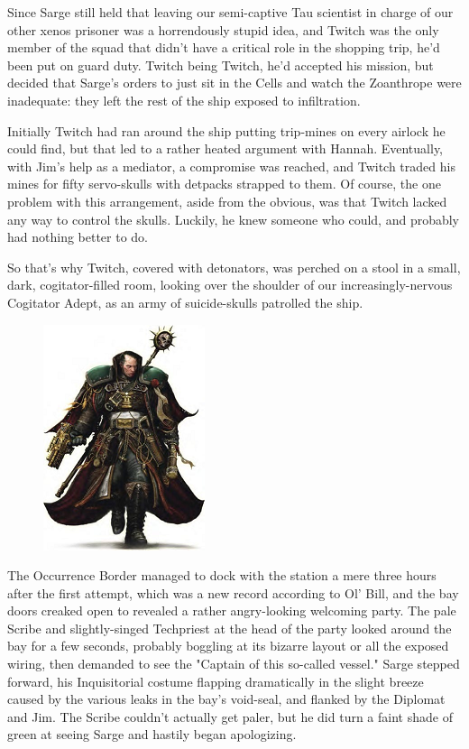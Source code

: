 Since Sarge still held that leaving our semi-captive Tau scientist in charge of our other xenos prisoner was a horrendously stupid idea, and Twitch was the only member of the squad that didn't have a critical role in the shopping trip, he'd been put on guard duty. 
Twitch being Twitch, he'd accepted his mission, but decided that Sarge's orders to just sit in the Cells and watch the Zoanthrope were inadequate: 
they left the rest of the ship exposed to infiltration.

Initially Twitch had ran around the ship putting trip-mines on every airlock he could find, but that led to a rather heated argument with Hannah. 
Eventually, with Jim's help as a mediator, a compromise was reached, and Twitch traded his mines for fifty servo-skulls with detpacks strapped to them. 
Of course, the one problem with this arrangement, aside from the obvious, was that Twitch lacked any way to control the skulls. 
Luckily, he knew someone who could, and probably had nothing better to do.

So that's why Twitch, covered with detonators, was perched on a stool in a small, dark, cogitator-filled room, looking over the shoulder of our increasingly-nervous Cogitator Adept, as an army of suicide-skulls patrolled the ship.

\begin{figure}
	\begin{center}
		\includegraphics[width=\figwidth]{pics/14/8.png}
	\end{center}
\end{figure}
The Occurrence Border managed to dock with the station a mere three hours after the first attempt, which was a new record according to Ol' Bill, and the bay doors creaked open to revealed a rather angry-looking welcoming party. 
The pale Scribe and slightly-singed Techpriest at the head of the party looked around the bay for a few seconds, probably boggling at its bizarre layout or all the exposed wiring, then demanded to see the "Captain of this so-called vessel." Sarge stepped forward, his Inquisitorial costume flapping dramatically in the slight breeze caused by the various leaks in the bay's void-seal, and flanked by the Diplomat and Jim. 
The Scribe couldn't actually get paler, but he did turn a faint shade of green at seeing Sarge and hastily began apologizing.

